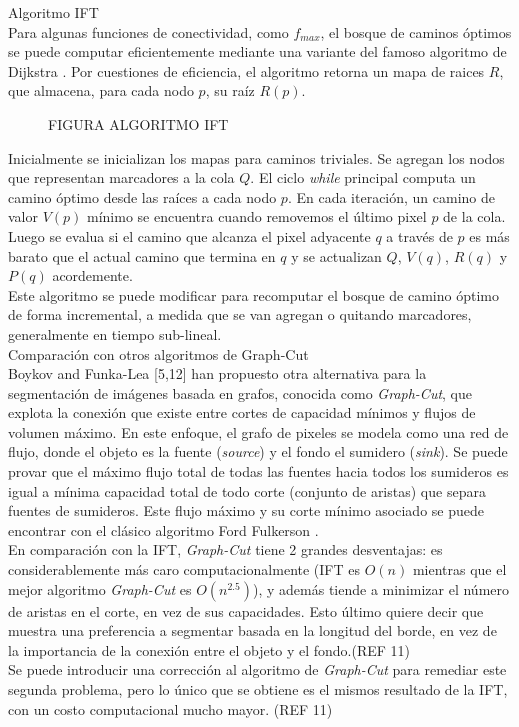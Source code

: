\documentclass[a4paper,10pt]{article}
\begin{document}
Algoritmo IFT\\
Para algunas funciones de conectividad, como $f_{max}$, el bosque de caminos
óptimos se puede computar eficientemente mediante una variante del famoso 
algoritmo de Dijkstra \cite{watershed-segmentation}. Por cuestiones de
eficiencia, el algoritmo retorna un mapa de raices $R$, que almacena, para 
cada nodo $p$, su raíz $R(p)$.\\

 \begin{figure}[H]
        \caption{FIGURA ALGORITMO IFT}
        \label{fig:IFTrace-IFT-algorithm}
\end{figure}

Inicialmente se inicializan los mapas para caminos triviales. Se agregan 
los nodos que representan marcadores a la cola $Q$. El ciclo \textit{while}
principal computa un camino óptimo desde las raíces a cada nodo $p$. En 
cada iteración, un camino de valor $V(p)$ mínimo se encuentra cuando
removemos el último pixel $p$ de la cola. Luego se evalua si el camino que
alcanza el pixel adyacente $q$ a través de $p$ es más barato que el actual 
camino que termina en $q$ y se actualizan $Q$, $V(q)$, $R(q)$ y $P(q)$ 
acordemente.\\
Este algoritmo se puede modificar para recomputar el bosque de camino óptimo 
de forma incremental, a medida que se van agregan o quitando marcadores, 
generalmente en tiempo sub-lineal.\\

Comparación con otros algoritmos de Graph-Cut\\

Boykov and Funka-Lea [5,12] han propuesto otra alternativa para la segmentación
de imágenes basada en grafos, conocida como \textit{Graph-Cut}, que explota 
la conexión que existe entre cortes de capacidad mínimos y flujos de volumen
máximo. En este enfoque, el grafo de pixeles se modela como una red de flujo,
donde el objeto es la fuente (\textit{source}) y el fondo el sumidero
(\textit{sink}). Se puede provar que el máximo flujo total de todas las fuentes
hacia todos los sumideros es igual a mínima capacidad total de todo corte 
(conjunto de aristas) que separa fuentes de sumideros. Este flujo máximo y su 
corte mínimo asociado se puede encontrar con el clásico algoritmo 
Ford Fulkerson \cite{Cormen:2009:IAT:1614191}.\\
En comparación con la IFT, \textit{Graph-Cut} tiene 2 grandes desventajas: es 
considerablemente más caro computacionalmente (IFT es $O(n)$ mientras que
el mejor algoritmo \textit{Graph-Cut} es $O(n^{2.5})$), y además tiende a 
minimizar el número de aristas en el corte, en vez de sus capacidades. Esto 
último quiere decir que muestra una preferencia a segmentar basada en la 
longitud del borde, en vez de la importancia de la conexión entre el objeto y 
el fondo.(REF 11)\\
Se puede introducir una corrección al algoritmo de \textit{Graph-Cut} para 
remediar este segunda problema, pero lo único que se obtiene es el mismos 
resultado de la IFT, con un costo computacional mucho mayor. (REF 11)
\end{document}
